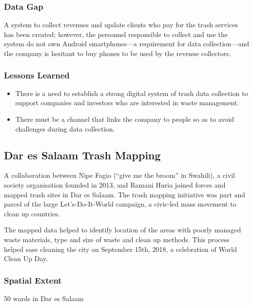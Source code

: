 \documentclass[a4paper,12pt,twoside]{article}
\begin{document}
\subsubsection{Data Gap}
A system to collect revenues and update clients who pay for the trash services has been created; however, the personnel responsible to collect and use the system do not own Android smartphones---a requirement for data collection---and the company is hesitant to buy phones to be used by the revenue collectors.

\subsubsection{Lessons Learned}
\begin{itemize}
    \item There is a need to establish  a strong digital system of trash data collection to support companies and investors who are interested in waste management.
    \item There must be a channel that links the company to people so as to avoid challenges during data collection.
\end{itemize}

\newpage
\subsection{Dar es Salaam Trash Mapping}
A collaboration between Nipe Fagio (“give me the broom” in Swahili), a civil society organisation founded in 2013, and Ramani Huria joined forces and mapped trash sites in Dar es Salaam. The trash mapping initiative was part and parcel of the large Let’s-Do-It-World campaign, a civic-led mass movement to clean up countries.

The mapped data helped to identify location of the areas with poorly managed waste materials, type and size of waste and clean up methods. This process helped ease cleaning the city on September 15th, 2018, a celebration of World Clean Up Day.

\subsubsection{Spatial Extent}
50 wards in Dar es Salaam
\end{document}
